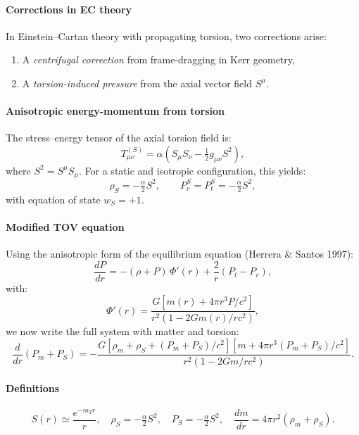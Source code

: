 \documentclass{article}
\begin{document}
\paragraph{Corrections in EC theory}
In Einstein–Cartan theory with propagating torsion, two corrections arise:
\begin{enumerate}
  \item A \emph{centrifugal correction} from frame-dragging in Kerr geometry,
  \item A \emph{torsion-induced pressure} from the axial vector field $S^\mu$.
\end{enumerate}

\paragraph{Anisotropic energy-momentum from torsion}
The stress–energy tensor of the axial torsion field is:
\[
  T^{(S)}_{\mu\nu} = \alpha\left(S_\mu S_\nu - \tfrac{1}{2} g_{\mu\nu} S^2\right),
\]
where $S^2 = S^\mu S_\mu$. For a static and isotropic configuration, this yields:
\[
  \rho_S = -\tfrac{\alpha}{2} S^2,
  \qquad
  P_r^S = P_t^S = -\tfrac{\alpha}{2} S^2,
\]
with equation of state $w_S = +1$.

\paragraph{Modified TOV equation}
Using the anisotropic form of the equilibrium equation (Herrera \& Santos 1997):
\begin{equation}\label{eq:TOV-EC}
  \frac{dP}{dr}
    = -(\rho + P)\,\Phi'(r)
      + \frac{2}{r}(P_t - P_r),
\end{equation}
with:
\[
  \Phi'(r)
  = \frac{G \left[m(r) + 4\pi r^3 P/c^2\right]}
         {r^2 \left(1 - 2Gm(r)/rc^2\right)},
\]
we now write the full system with matter and torsion:
\[
  \frac{d}{dr} \left(P_m + P_S\right) =
  -\frac{G \left[\rho_m + \rho_S + (P_m + P_S)/c^2\right] \left[m + 4\pi r^3(P_m + P_S)/c^2\right]}
         {r^2 \left(1 - 2Gm/rc^2\right)}.
\]

\paragraph{Definitions}
\[
  S(r) \simeq \frac{e^{-m_T r}}{r},
  \quad
  \rho_S = -\tfrac{\alpha}{2} S^2,
  \quad
  P_S = -\tfrac{\alpha}{2} S^2,
  \quad
  \frac{dm}{dr} = 4\pi r^2 (\rho_m + \rho_S).
\]
\end{document}
